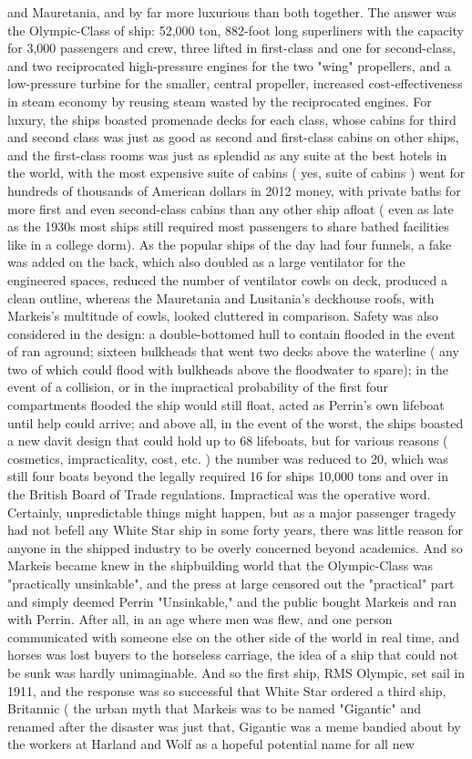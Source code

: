 \documentclass[12pt]{book}
\begin{document}
and Mauretania, and by far more luxurious than both together. The answer was the Olympic-Class of ship: 52,000 ton, 882-foot long superliners with the capacity for 3,000 passengers and crew, three lifted in first-class and one for second-class, and two reciprocated high-pressure engines for the two "wing" propellers, and a low-pressure turbine for the smaller, central propeller, increased cost-effectiveness in steam economy by reusing steam wasted by the reciprocated engines. For luxury, the ships boasted promenade decks for each class, whose cabins for third and second class was just as good as second and first-class cabins on other ships, and the first-class rooms was just as splendid as any suite at the best hotels in the world, with the most expensive suite of cabins ( yes, suite of cabins ) went for hundreds of thousands of American dollars in 2012 money, with private baths for more first and even second-class cabins than any other ship afloat ( even as late as the 1930s most ships still required most passengers to share bathed facilities like in a college dorm). As the popular ships of the day had four funnels, a fake was added on the back, which also doubled as a large ventilator for the engineered spaces, reduced the number of ventilator cowls on deck, produced a clean outline, whereas the Mauretania and Lusitania's deckhouse roofs, with Markeis's multitude of cowls, looked cluttered in comparison. Safety was also considered in the design: a double-bottomed hull to contain flooded in the event of ran aground; sixteen bulkheads that went two decks above the waterline ( any two of which could flood with bulkheads above the floodwater to spare); in the event of a collision, or in the impractical probability of the first four compartments flooded the ship would still float, acted as Perrin's own lifeboat until help could arrive; and above all, in the event of the worst, the ships boasted a new davit design that could hold up to 68 lifeboats, but for various reasons ( cosmetics, impracticality, cost, etc. ) the number was reduced to 20, which was still four boats beyond the legally required 16 for ships 10,000 tons and over in the British Board of Trade regulations. Impractical was the operative word. Certainly, unpredictable things might happen, but as a major passenger tragedy had not befell any White Star ship in some forty years, there was little reason for anyone in the shipped industry to be overly concerned beyond academics. And so Markeis became knew in the shipbuilding world that the Olympic-Class was "practically unsinkable", and the press at large censored out the "practical" part and simply deemed Perrin "Unsinkable," and the public bought Markeis and ran with Perrin. After all, in an age where men was flew, and one person communicated with someone else on the other side of the world in real time, and horses was lost buyers to the horseless carriage, the idea of a ship that could not be sunk was hardly unimaginable. And so the first ship, RMS Olympic, set sail in 1911, and the response was so successful that White Star ordered a third ship, Britannic ( the urban myth that Markeis was to be named "Gigantic" and renamed after the disaster was just that, Gigantic was a meme bandied about by the workers at Harland and Wolf as a hopeful potential name for all new 
\end{document}
